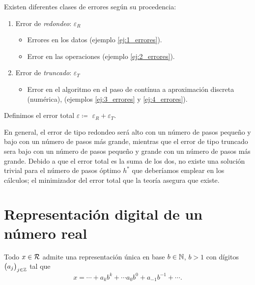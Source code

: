 \begin{defi}[error]
    Existen diferentes clases de errores según su procedencia:
    \begin{enumerate}
            \item Error de \emph{redondeo}: $\varepsilon_R$
            \begin{itemize}
                    \item Errores en los datos (ejemplo \ref{ej:1_errores}).
                    \item Error en las operaciones (ejemplo \ref{ej:2_errores}).
            \end{itemize}
            \item Error de \emph{truncado}: $\varepsilon_T$
            \begin{itemize}
                    \item Error en el algoritmo en el paso de contínua a aproximación discreta (numérica), (ejemplos \ref{ej:3_errores} y \ref{ej:4_errores}).
            \end{itemize}
    \end{enumerate}
\end{defi}

\begin{defi}
    Definimos el error total $\varepsilon \coloneqq$ $\varepsilon_R + \varepsilon_T$.
\end{defi}

\begin{obs}
    En general, el error de tipo redondeo será alto con un número de pasos pequeño y bajo con un número de pasos más grande, mientras que el error de tipo truncado sera bajo con un número de pasos pequeño y grande con un número de pasos más grande. Debido a que el error total es la suma de los dos, no existe una solución trivial para el número de pasos óptimo $h^*$ que deberíamos emplear en los cálculos; el minimizador del error total que la teoría asegura que existe.
\end{obs}

\section{Representación digital de un número real}
    
\begin{prop}
    Todo $x \in \mathcal{R}$ admite una representación única en base $b \in \mathbb{N}$, $b>1$ con dígitos $\left(  a_j\right)  _{j \in \mathbb{Z}}$ tal que 
    \[
            x = \cdots + a_kb^k + \cdots a_0b^0 + a_{-1}b^{-1} + \cdots \nonumber.
    \]
\end{prop}

